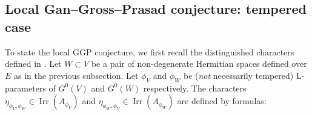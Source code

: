\documentclass[11pt,letterpaper]{amsart}
\theoremstyle{plain}
\numberwithin{theorem}{section}
\numberwithin{equation}{subsection}
\theoremstyle{remark}
\newcommand{\Irr}{\operatorname{Irr}}
\begin{document}
\vskip 5pt


\subsection{Local Gan--Gross--Prasad conjecture: tempered case} %
\label{sub:local_gan_gross_prasad_conjecture_tempered_case}

To state the local GGP conjecture, we first recall the distinguished characters defined in \cite[Sect. 6]{MR3202556}. Let $W\subset V$ be a pair of non-degenerate Hermitian spaces defined over $E$ as in the previous subsection. Let $\phi_V$ and $\phi_W$ be (\emph{not} necessarily tempered) L-parameters of $G^0\left(V\right)$ and $G^0\left(W\right)$ respectively. The characters $\eta_{\phi_V,\phi_W}\in\Irr\left(A_{\phi_V}\right)$ and $\eta_{\phi_W,\phi_V}\in\Irr\left(A_{\phi_W}\right)$ are defined by formulas:
\end{document}
